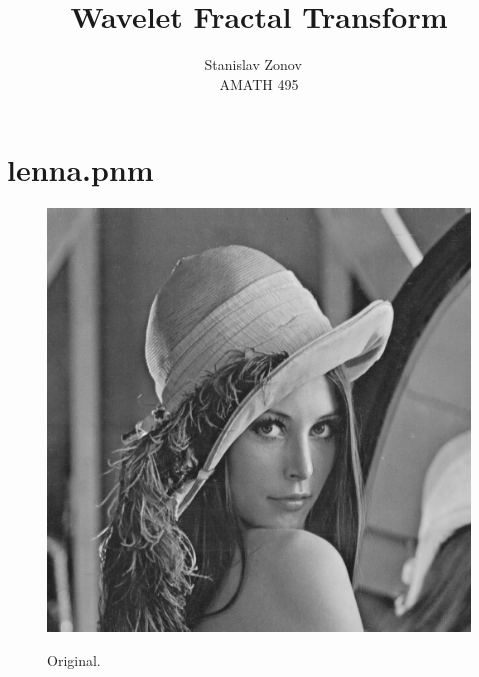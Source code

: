 \documentclass[english]{article}
\begin{document}
 
 
 
\title{Wavelet Fractal Transform}%
\author{Stanislav Zonov ~ \\ %
AMATH 495} %
 
\maketitle
\newpage


\newpage
\section{lenna.pnm}
\begin{figure}[H]
	\centering
  \includegraphics[width=.5\linewidth]{../images/lenna.png}
  \label{fig:fig1}
  \caption{Original.}
\end{figure}
\end{document}
